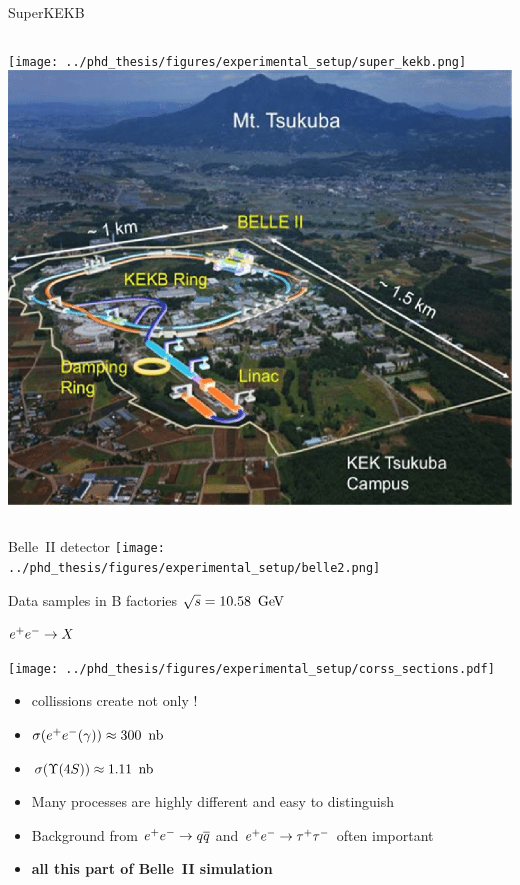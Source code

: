 \documentclass[xcolor=dvipsnames]{beamer}
\begin{document}
   \begin{frame}{SuperKEKB}
      \begin{columns}
         \texttt{[image: ../phd\_thesis/figures/experimental\_setup/super\_kekb.png]}
         \includegraphics[width=1\textwidth]{figures/Layout-of-SuperKEKB-at-the-KEK-Tsukuba-campus.png}
      \end{columns}
   \end{frame}

   \begin{frame}{Belle~II detector}
      \texttt{[image: ../phd\_thesis/figures/experimental\_setup/belle2.png]}
   \end{frame}


   \begin{frame}{Data samples in B factories}
      \scriptsize\centering
      \textbf{$\sqrt{s} = 10.58~\mathrm{\,Ge\kern -0.1em V}$}
      
      $e^+e^-\rightarrow X$

      \texttt{[image: ../phd\_thesis/figures/experimental\_setup/corss\_sections.pdf]}
      \begin{itemize}
         \item \epem collissions create not only \FourS!
         \item[] $\sigma({e^+e^-(\gamma)}) \approx 300~{\rm \,nb}$
         \item[] $\sigma({\FourS}) \approx 1.11~\nb$
         \item Many processes are highly different and easy to distinguish
         \item Background from $e^+e^-\rightarrow q\overline q$ and $e^+e^-\rightarrow\tau^+\tau^-$ often important
         \item[\ra] \textbf{all this part of Belle~II simulation}
      \end{itemize}
   \end{frame}
\end{document}
